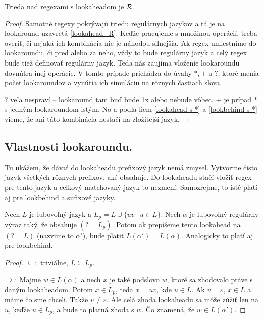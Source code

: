 \begin{veta} \label{reg_uz_la}
Trieda nad regexami s lookaheadom je ${\cal R}$.
\end{veta}
\begin{proof}
Samotné regexy pokrývajú triedu regulárnych jazykov a tá je na lookaround uzavretá \ref{lookahead+R}. Keďže pracujeme s množinou operácií, treba overiť, či nejaká ich kombinácia nie je náhodou silnejšia. Ak regex umiestnime do lookaroundu, či pred alebo za neho, vždy to bude regulárny jazyk a celý regex bude tiež definovať regulárny jazyk. Teda nás zaujíma vloženie lookaroundu dovnútra inej operácie. V tomto prípade prichádza do úvahy $*,+$ a $?$, ktoré menia počet lookaroundov a vynútia ich simuláciu na rôznych častiach slova.

$?$ veľa nespraví -- lookaround tam buď bude 1x alebo nebude vôbec. $+$ je prípad $*$ s jedným lookaroundom istým. No a podľa liem \ref{lookahead s *} a \ref{lookbehind s *} vieme, že ani táto kombinácia nestačí na zložitejší jazyk.
\end{proof}

\subsection{Vlastnosti lookaroundu.}

Tu ukážem, že dávať do lookaheadu prefixový jazyk nemá zmysel. Vytvorme čisto jazyk všetkých rôznych prefixov, aké obsahuje. Do lookaheadu stačí vložiť regex pre tento jazyk a celkový matchovaný jazyk to nezmení. Samozrejme, to isté platí aj pre lookbehind a sufixové jazyky.

\begin{veta}\label{bezprefixove}
Nech $L$ je ľubovoľný jazyk a $L_p = L \cup \lbrace uv ~|~ u \in L \rbrace$. Nech $\alpha$ je ľubovoľný regulárny výraz taký, že obsahuje $(?=L_p)$. Potom ak prepíšeme tento lookahead na $(?=L)$ (nazvime to $\alpha '$), bude platiť $L(\alpha ') = L(\alpha )$. Analogicky to platí aj pre lookbehind.
\end{veta}
\begin{proof}
$\subseteq :$ triviálne,  $L \subseteq L_p$.

$\supseteq :$ Majme $w \in L(\alpha)$ a nech $x$ je také podslovo $w$, ktoré sa zhodovalo práve s daným lookaheadom. Potom $x \in L_p$, teda $x=uv$, kde $u \in L$. Ak $v=\varepsilon$, $x \in L$ a máme čo sme chceli. Takže $v\neq \varepsilon$. Ale celá zhoda lookaheadu sa môže zúžiť len na $u$, keďže $u \in L_p$, a bude to platná zhoda s $w$. Čo znamená, že $w \in L(\alpha ')$.
\end{proof}

